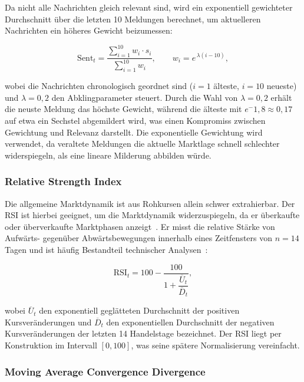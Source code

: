 Da nicht alle Nachrichten gleich relevant sind, wird ein exponentiell gewichteter Durchschnitt über die letzten 10 Meldungen berechnet, um aktuelleren Nachrichten ein höheres Gewicht beizumessen:

\begin{equation}
    \text{Sent}_t = \frac{\sum_{i=1}^{10} w_i \cdot s_i}{\sum_{i=1}^{10} w_i},
    \qquad w_i = e^{\,\lambda (i - 10)},
\end{equation}

wobei die Nachrichten chronologisch geordnet sind ($i = 1$ älteste, $i = 10$ neueste) und $\lambda = 0,2$ den Abklingparameter steuert. Durch die Wahl von $\lambda = 0,2$ erhält die neuste Meldung das höchste Gewicht, während die älteste mit $e^-1,8 \approx 0,17$ auf etwa ein Sechstel abgemildert wird, was einen Kompromiss zwischen Gewichtung und Relevanz darstellt. Die exponentielle Gewichtung wird verwendet, da veraltete Meldungen die aktuelle Marktlage schnell schlechter widerspiegeln, als eine lineare Milderung abbilden würde.

\subsubsection{Relative Strength Index}

Die allgemeine Marktdynamik ist aus Rohkursen allein schwer extrahierbar. Der \ac{RSI} ist hierbei geeignet, um die Marktdynamik widerzuspiegeln, da er überkaufte oder überverkaufte Marktphasen anzeigt~\cite{wilder1978}. Er misst die relative Stärke von Aufwärts- gegenüber Abwärtsbewegungen innerhalb eines Zeitfensters von $n = 14$ Tagen und ist häufig Bestandteil technischer Analysen~\cite{wilder1978}:

\begin{equation}
    \text{RSI}_t = 100 - \frac{100}{1 + \dfrac{\overline{U}_t}{\overline{D}_t}},
\end{equation}

wobei $\overline{U}_t$ den exponentiell geglätteten Durchschnitt der positiven Kursveränderungen und $\overline{D}_t$ den exponentiellen Durchschnitt der negativen Kursveränderungen der letzten 14 Handelstage bezeichnet. Der \ac{RSI} liegt per Konstruktion im Intervall $[0, 100]$, was seine spätere Normalisierung vereinfacht.

\subsubsection{Moving Average Convergence Divergence}

